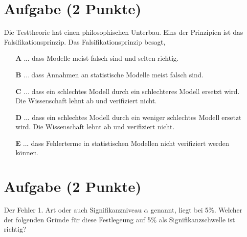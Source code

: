 \documentclass[a4paper, 9pt]{scrartcl}\usepackage[]{graphicx}\usepackage[]{xcolor}
\begin{document}
\section{Aufgabe \hfill (2 Punkte)}



Die Testtheorie hat einen philosophischen Unterbau. Eins der Prinzipien ist das Falsifikationsprinzip. Das Falsifikationsprinzip besagt,



\begin{enumerate}
\item [\textbf{A} \msquare] ... dass Modelle meist falsch sind und selten richtig.
\item [\textbf{B} \msquare] ... dass Annahmen an statistische Modelle meist falsch sind.
\item [\textbf{C} \msquare] ... dass ein schlechtes Modell durch ein schlechteres Modell ersetzt wird. Die Wissenschaft lehnt ab und verifiziert nicht.
\item [\textbf{D} \msquare] ... dass ein schlechtes Modell durch ein weniger schlechtes Modell ersetzt wird. Die Wissenschaft lehnt ab und verifiziert nicht.
\item [\textbf{E} \msquare] ... dass Fehlerterme in statistischen Modellen nicht verifiziert werden können.
\end{enumerate}

\section{Aufgabe \hfill (2 Punkte)}



Der Fehler 1. Art oder auch Signifikanzniveau $\alpha$ genannt, liegt bei
5\%. Welcher der folgenden Gründe für diese Festlegeung auf 5\% als Signifikanzschwelle ist richtig?
\end{document}
